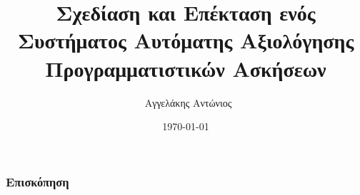 \documentclass{beamer}
\title[Επέκταση Grader]{Σχεδίαση και Επέκταση ενός Συστήματος Αυτόματης Αξιολόγησης Προγραμματιστικών Ασκήσεων} %
\author[Αγγελάκης Αντώνιος]{~Αγγελάκης Αντώνιος\inst{1}} %
\institute[ΕΜΠ] %
{
  \inst{1}
  Εθνικό Μετσόβιο Πολυτεχνείο \texttt{[image: ../Figures/Pyrforos.png]} \\ %
  \textit{a.angelakis@protonmail.com} %
\medskip
}
\date{{\ddmmyyyydate\today}} %
\begin{document}
\begin{frame}
\titlepage %
\end{frame}

\begin{frame}
\frametitle{Επισκόπηση} %
\tableofcontents %
\end{frame}

\end{document}
